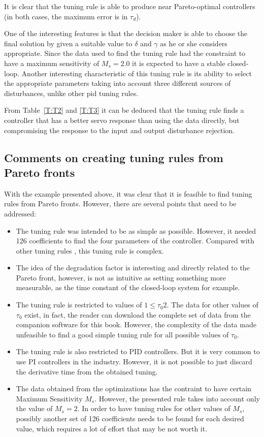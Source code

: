 It is clear that the tuning rule is able to produce near Pareto-optimal controllers (in both cases, the maximum error is in $\tau_d$).

One of the interesting features is that the decision maker is able to choose the final solution by given a suitable value to $\delta$ and $\gamma$ as he or she considers appropriate. Since the data used to find the tuning rule had the constraint to have a maximum sensitivity of $M_s =2.0$ it is expected to have a stable closed-loop. Another interesting characteristic of this tuning rule is its ability to select the appropriate parameters taking into account three different sources of disturbances, unlike other \gls{pid} tuning rules.

From Table~\ref{T:T2} and \ref{T:T3} it can be deduced that the tuning rule finds a controller that has a better servo response than using the data directly, but compromising the response to the input and output disturbance rejection.

\subsection{Comments on creating tuning rules from Pareto fronts}
\label{sec:TuningRules}
With the example presented above, it was clear that it is feasible to find tuning rules from Pareto fronts. However, there are several points that need to be addressed:
\begin{itemize}
	\item The tuning rule was intended to be as simple as possible. However, it needed 126 coefficients to find the four parameters of the controller. Compared with other tuning rules \cite{odwyer2006}, this tuning rule is complex.
	\item The idea of the degradation factor is interesting and directly related to the Pareto front, however, is not as intuitive as setting something more measurable, as the time constant of the closed-loop system for example.
	\item The tuning rule is restricted to values of $1 \leq \tau_0 2$. The data for other values of $\tau_0$ exist, in fact, the reader can download the complete set of data from the companion software for this book. However, the complexity of the data made unfeasible to find a good simple tuning rule for all possible values of $\tau_0$.
	\item The tuning rule is also restricted to PID controllers. But it is very common to use PI controllers in the industry. However, it is not possible to just discard the derivative time from the obtained tuning.
	\item The data obtained from the optimizations has the contraint to have certain Maximum Sensitivity $M_s$. However, the presented rule takes into account only the value of $M_s = 2$. In order to have tuning rules for other values of $M_s$, possibly another set of 126 coefficients needs to be found for each desired value, which requires a lot of effort that may be not worth it.
\end{itemize}

